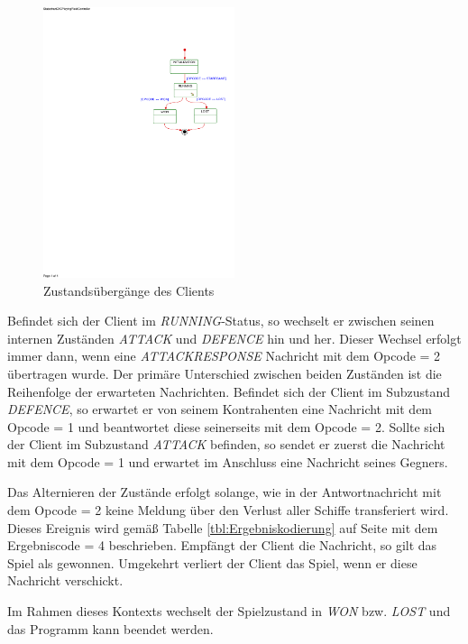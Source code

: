 \begin{figure}[H]
  \centering
  \includegraphics[trim=105mm 155mm 5mm 42mm,clip,width=0.5\textwidth]{images/SMController.pdf}
  \caption{Zustandsübergänge des Clients}
  \label{fig:Clientstates}
\end{figure}

Befindet sich der Client im \emph{RUNNING}-Status, so wechselt er zwischen seinen internen Zuständen \emph{ATTACK} und \emph{DEFENCE} hin und her.
Dieser Wechsel erfolgt immer dann, wenn eine \emph{ATTACKRESPONSE} Nachricht mit dem Opcode = 2 übertragen wurde.
Der primäre Unterschied zwischen beiden Zuständen ist die Reihenfolge der erwarteten Nachrichten.
Befindet sich der Client im Subzustand \emph{DEFENCE}, so erwartet er von seinem Kontrahenten eine Nachricht mit dem Opcode = 1 und beantwortet diese seinerseits mit dem Opcode = 2.
Sollte sich der Client im Subzustand \emph{ATTACK} befinden, so sendet er zuerst die Nachricht mit dem Opcode = 1 und erwartet im Anschluss eine Nachricht seines Gegners.

Das Alternieren der Zustände erfolgt solange, wie in der Antwortnachricht mit dem Opcode = 2 keine Meldung über den Verlust aller Schiffe transferiert wird.
Dieses Ereignis wird gemäß Tabelle \ref{tbl:Ergebniskodierung} auf Seite \pageref{tbl:Ergebniskodierung} mit dem Ergebniscode = 4 beschrieben.
Empfängt der Client die Nachricht, so gilt das Spiel als gewonnen.
Umgekehrt verliert der Client das Spiel, wenn er diese Nachricht verschickt.

Im Rahmen dieses Kontexts wechselt der Spielzustand in \emph{WON} bzw. \emph{LOST} und das Programm kann beendet werden.

